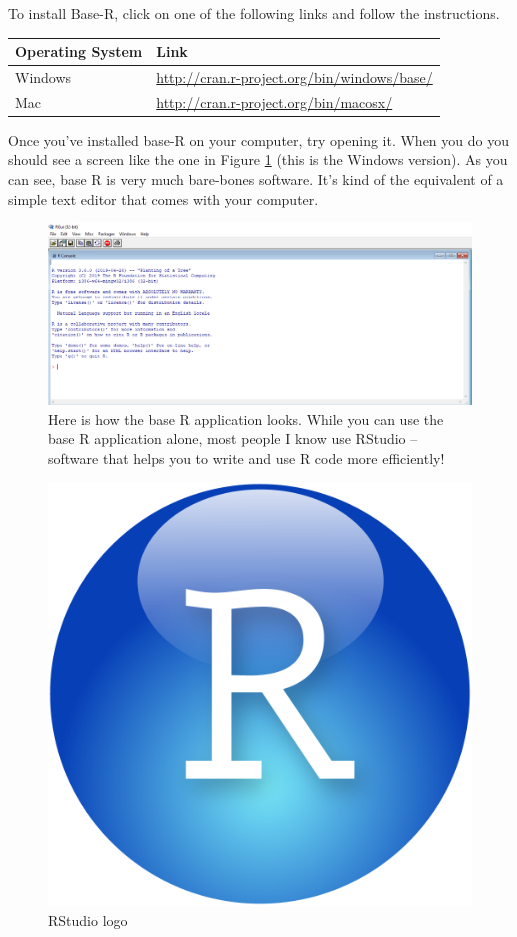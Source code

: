 \documentclass[
]{book}
\begin{document}
To install Base-R, click on one of the following links and follow the instructions.

\begin{longtable}[]{@{}ll@{}}
\toprule
Operating System & Link\tabularnewline
\midrule
\endhead
Windows & \url{http://cran.r-project.org/bin/windows/base/}\tabularnewline
Mac & \url{http://cran.r-project.org/bin/macosx/}\tabularnewline
\bottomrule
\end{longtable}

Once you've installed base-R on your computer, try opening it. When you do you should see a screen like the one in Figure \ref{fig:rscreenshot} (this is the Windows version). As you can see, base R is very much bare-bones software. It's kind of the equivalent of a simple text editor that comes with your computer.

\begin{figure}

{\centering \includegraphics[width=0.75\linewidth]{images/RScreenshot} 

}

\caption{Here is how the base R application looks. While you can use the base R application alone, most people I know use RStudio -- software that helps you to write and use R code more efficiently!}\label{fig:rscreenshot}
\end{figure}

\begin{figure}

{\centering \includegraphics[width=0.4\linewidth]{images/RStudio} 

}

\caption{RStudio logo}\label{fig:rstudiologo}
\end{figure}
\end{document}

